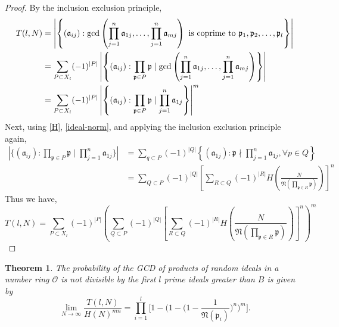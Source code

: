 \documentclass[10pt,a4paper]{article}
\newtheorem{theorem}{Theorem}[section]
\theoremstyle{definition}
\theoremstyle{remark}
\newcommand{\f}[1]{\mathfrak{#1}}
\begin{document}
\begin{proof}
By the inclusion exclusion principle, 
		\begin{align}
			T(l,N)&=\left|\left\{(\f{a}_{ij}): \gcd\left(\prod_{j=1}^{n}\f{a}_{1j},\mathellipsis,\prod_{j=1}^{n}\f{a}_{mj}\right)\text{ is coprime to } \f{p}_1,\f{p}_2,\mathellipsis,\f{p}_l\right\}\right|\\
			&= \sum_{P\subset X_l}(-1)^{|P|}\left|\left\{(\f{a}_{ij}): \prod_{\f{p}\in P} \f{p} \mid \gcd\left(\prod_{j=1}^{n}\f{a}_{1j},\mathellipsis, \prod_{j=1}^{n}\f{a}_{mj}\right)\right\}\right|\\
			&=\sum_{P\subset X_l}(-1)^{|P|}\left|\left\{(\f{a}_{ij}): \prod_{\f{p}\in P} \f{p} \mid \prod_{j=1}^{n}\f{a}_{1j}\right\}\right|^m
		\end{align}
		 Next, using \cref{H}, \cref{ideal-norm}, and applying the inclusion exclusion principle again,
		\begin{align}
			\left|\Biggl\{(\f{a}_{ij}): \prod_{\f{p}\in P} \f{p} \mid \prod_{j=1}^{n} \f{a}_{1j}\Biggr\}\right| &=\sum_{q\subset P}(-1)^{|Q|}\left\{(\f{a}_{1j}): \f{p}\nmid \prod_{j=1}^n\f{a}_{1j}, \forall p\in Q\right\} \\ 
			&=\sum_{Q\subset P} (-1)^{|Q|}\left[\sum_{R\subset Q}(-1)^{|R|}H\left(\frac{N}{\f{N}\left(\prod_{\f{p}\in R}\f{p}\right)}\right)\right]^n
		\end{align}
	Thus we have, 
	\begin{equation}
		T(l,N) = \sum_{P\subset X_l}(-1)^{|P|} \left(\sum_{Q\subset P} (-1)^{|Q|} \left[\sum_{R\subset Q}(-1)^{|R|}H\left(\frac{N}{\f{N}\left(\prod_{\f{p}\in R}\f{p}\right)}\right)\right]^n\right)^m
	\end{equation}
	\end{proof}




\begin{theorem} The probability of the GCD of products of random ideals in a number ring $\mathcal{O}$ is not divisible by the first $l$ prime ideals greater than $B$ is given by
$$\lim\limits_{N\to\infty}\frac{T(l,N)}{H(N)^{mn}} =\prod_{i=1}^{l}\Big[1-\Big(1 - \Big(1 - \frac{1}{\f{N}(\f{p}_i)}\Big)^n\Big)^m\Big].$$
\end{theorem}
\end{document}

